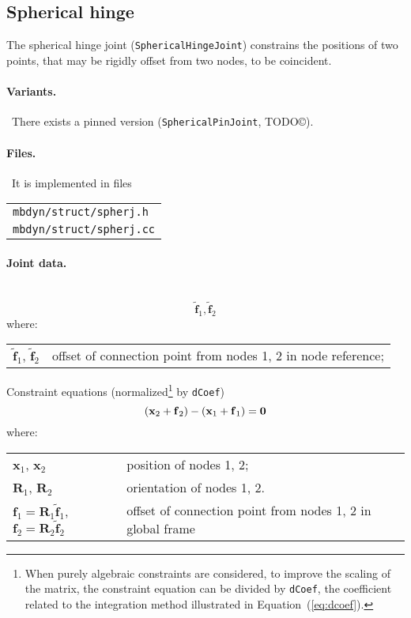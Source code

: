 \documentclass[10pt,dvips,fleqn,subeqn]{report}
\newcommand{\T}[1]{\bm{\mathbf{#1}}}
\begin{document}
\subsection{Spherical hinge}
The spherical hinge joint (\texttt{SphericalHingeJoint}) constrains the positions
of two points, that may be rigidly offset from two nodes, to be coincident.

\paragraph{Variants.} \
There exists a pinned version (\texttt{SphericalPinJoint}, TODO\copyright).

\paragraph{Files.} \
It is implemented in files

\begin{tabular}{l}
\texttt{mbdyn/struct/spherj.h} \\
\texttt{mbdyn/struct/spherj.cc}
\end{tabular}

\paragraph{Joint data.} \
\begin{equation}
	\tilde{\T{f}}_1, \tilde{\T{f}}_2
\end{equation}
where:

\noindent
\begin{tabular}{ll}
$\tilde{\T{f}}_1$, $\tilde{\T{f}}_2$ & offset of connection point from nodes 1, 2 in node reference; \\
\end{tabular}

\noindent
Constraint equations (normalized\footnote{When purely algebraic
constraints are considered, to improve the scaling of the matrix,
the constraint equation can be divided by \texttt{dCoef},
the coefficient related to the integration method illustrated 
in Equation~(\ref{eq:dcoef}).
} by \texttt{dCoef})
\begin{equation}
	\plbr{\T{x}_2 + \T{f}_2} - \plbr{\T{x}_1 + \T{f}_1} = \T{0}
\end{equation}
where:

\noindent
\begin{tabular}{ll}
$\T{x}_1$, $\T{x}_2$ & position of nodes 1, 2; \\
$\T{R}_1$, $\T{R}_2$ & orientation of nodes 1, 2.\\
$\T{f}_1 = \T{R}_1 \tilde{\T{f}}_1$, $\T{f}_2 = \T{R}_2 \tilde{\T{f}}_2$ & offset of connection point from nodes 1, 2 in global frame
\end{tabular}
\end{document}
